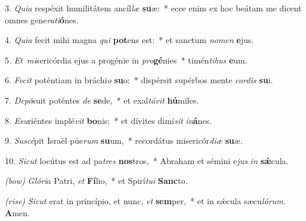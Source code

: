 3. \textit{Quia} respéxit humilitátem ancíl\textit{læ} \textbf{su}æ:~* ecce enim ex hoc beátam me dicent omnes gene\textit{ra}\textit{ti}\textbf{ó}nes.

4. \textit{Quia} fecit mihi magna \textit{qui} \textbf{pot}ens est:~* et sanctum \textit{no}\textit{men} \textbf{e}jus.

5. \textit{Et\ mi}sericórdia ejus a progénie in \textit{pro}\textbf{gé}nies~* timén\textit{ti}\textit{bus} \textbf{e}um.

6. \textit{Fecit} poténtiam in bráchi\textit{o} \textbf{su}o:~* dispérsit supérbos mente \textit{cor}\textit{dis} \textbf{su}i.

7. \textit{Depó}suit poténtes \textit{de} \textbf{se}de,~* et exal\textit{tá}\textit{vit} \textbf{hú}miles.

8. \textit{Esu}riéntes implé\textit{vit} \textbf{bo}nis:~* et dívites dimí\textit{sit} \textit{in}\textbf{á}nes.

9. \textit{Suscé}pit Israël púe\textit{rum} \textbf{su}um,~* recordátus misericór\textit{di}\textit{æ} \textbf{su}æ.

10. \textit{Sicut} locútus est ad pa\textit{tres} \textbf{nos}tros,~* Abraham et sémini e\textit{jus} \textit{in} \textbf{s\'{\ae}}cula.

\textit{(bow)} \textit{Glóri}a Patri, \textit{et} \textbf{Fí}lio,~* et Spirí\textit{tu}\textit{i} \textbf{Sanc}to.

\textit{(rise)} \textit{Sicut} erat in princípio, et nunc, \textit{et} \textbf{sem}per,~* et in s\'{\ae}cula sæcu\textit{ló}\textit{rum}. \textbf{A}men.